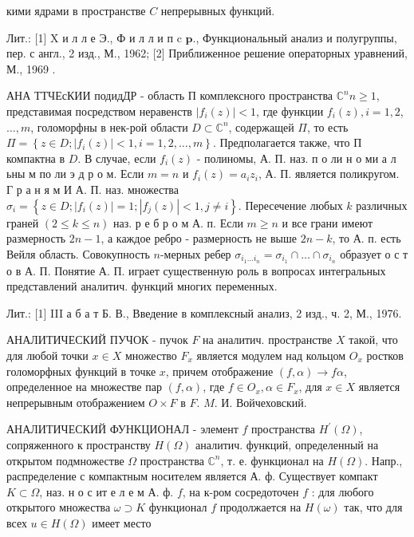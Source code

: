 \documentclass[10pt]{article}
\begin{document}
кими ядрами в пространстве $C$ непрерывных функций.



Лит.: [1] X и л л е Э., Ф и л л и п c $\mathbf{p} .$, Функциональный анализ и полугруппы, пер. с англ., 2 изд., М., 1962; [2] Приближенное решение операторных уравнений, М., 1969 .



АНА ТТЧЕсКИИ подидДР - область П комплексного пространства $\mathbb{C}^{n} n \geqslant 1$, представимая посредством неравенств $\left|f_{i}(z)\right|<1$, где функции $f_{i}(z), i=1,2$, $\ldots, m$, голоморфны в нек-рой области $D \subset \mathbb{C}^{n}$, содержащей $\Pi$, то есть $\Pi=\left\{z \in D ;\left|f_{i}(z)\right|<1, i=1,2, \ldots, m\right\}$. Предполагается также, что П компактна в $D$. В случае, если $f_{i}(z)$ - полиномы, А. П. наз. п о ли н о ми а л ьны м по ли э д р о м. Если $m=n$ и $f_{i}(z)=a_{i} z_{i}$, А. П. является поликругом. Г р а н я м И А. П. наз. множества $\sigma_{i}=\left\{z \in D ;\left|f_{i}(z)\right|=1 ;\left|f_{j}(z)\right|<1, j \neq i\right\}$. Пересечение любых $k$ различных граней $(2 \leqslant k \leqslant n)$ наз. р е б р о м А. п. Если $m \geqslant n$ и все грани имеют размерность $2 n-1$, а каждое ребро - размерность не выше $2 n-k$, то А. п. есть Вейля область. Совокупность $n$-мерных ребер $\sigma_{i_{1} \ldots i_{n}}=\sigma_{i_{1}} \cap \ldots \cap \sigma_{i_{n}}$ образует о с т о в А. П. Понятие А. П. играет существенную роль в вопросах интегральных представлений аналитич. функций многих переменных.



Лит.: [1] III а б а т Б. В., Введение в комплексный анализ, 2 изд., ч. 2, М., 1976.



АНАЛИТИЧЕСКИЙ ПУЧОК - пучок $F$ на аналитич. пространстве $X$ такой, что для любой точки $x \in X$ множество $F_{x}$ является модулем над кольцом $O_{x}$ ростков голоморфных функций в точке $x$, причем отображение $(f, \alpha) \rightarrow f \alpha$, определенное на множестве пар $(f, \alpha)$, где $f \in O_{x}, \alpha \in F_{x}$, для $x \in X$ является непрерывным отображением $O \times F$ в $F$. $M$. И. Войчеховский.



АНАЛИТИЧЕСКИЙ ФУНКЦИОНАЛ - элемент $f$ пространства $H^{\prime}(\Omega)$, сопряженного к пространству $H(\Omega)$ аналитич. функций, определенный на открытом подмножестве $\Omega$ пространства $\mathbb{C}^{n}$, т. е. функционал на $H(\Omega)$. Напр., распределение с компактным носителем является А. ф. Существует компакт $K \subset \Omega$, наз. н о с ит е л е м А. ф. $f$, на к-ром сосредоточен $f$ : для любого открытого множества $\omega \supset K$ функционал $f$ продолжается на $H(\omega)$ так, что для всех $u \in H(\Omega)$ имеет место
\end{document}
